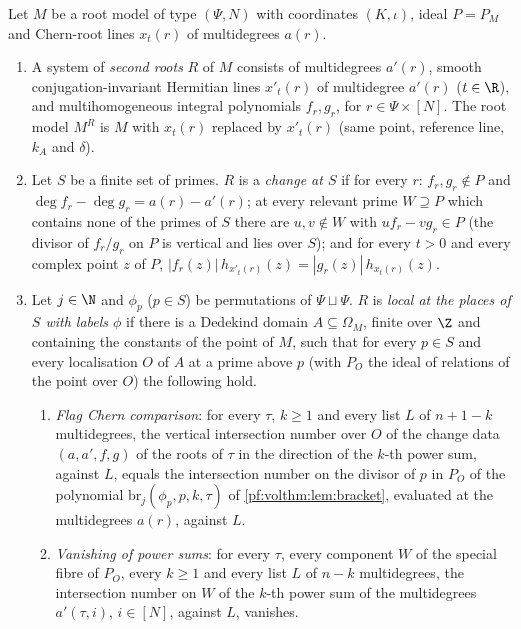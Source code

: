\begin{definition}\label{pf:volthm:def:secondroots}
Let $M$ be a root model of type $(\Psi,N)$ with coordinates $(K,\iota)$, ideal $P=P_M$ and Chern-root lines
$x_t(r)$ of multidegrees $a(r)$.
\begin{enumerate}[label=(\alph*)]
\item A system of \emph{second roots} $R$ of $M$ consists of multidegrees $a'(r)$, smooth conjugation-invariant
Hermitian lines $x'_t(r)$ of multidegree $a'(r)$ ($t\in\R$), and multihomogeneous integral polynomials $f_r,g_r$, for
$r\in\Psi\times[N]$. The root model $M^R$ is $M$ with $x_t(r)$ replaced by $x'_t(r)$ (same point, reference line,
$k_A$ and $\delta$).
\item Let $S$ be a finite set of primes. $R$ is a \emph{change at $S$} if for every $r$: $f_r,g_r\notin P$ and
$\deg f_r-\deg g_r=a(r)-a'(r)$; at every relevant prime $W\supseteq P$ which contains none of the primes of $S$ there are
$u,v\notin W$ with $uf_r-vg_r\in P$ (the divisor of $f_r/g_r$ on $P$ is vertical and lies over $S$); and for every
$t>0$ and every complex point $z$ of $P$, $|f_r(z)|\,h_{x'_t(r)}(z)=|g_r(z)|\,h_{x_t(r)}(z)$.
\item Let $j\in\N$ and $\phi_p$ ($p\in S$) be permutations of $\Psi\sqcup\Psi$. $R$ is \emph{local at the places of $S$
with labels $\phi$} if there is a Dedekind domain $A\subseteq\Omega_M$, finite over $\Z$ and containing the
constants of the point of $M$, such that for every $p\in S$ and every localisation $O$ of $A$ at a prime above $p$
(with $P_O$ the ideal of relations of the point over $O$) the following hold.
  \begin{enumerate}[label=(\roman*)]
  \item \emph{Flag Chern comparison}: for every $\tau$, $k\ge1$ and every list $L$ of $n+1-k$ multidegrees, the
  vertical intersection number over $O$ of the change data $(a,a',f,g)$ of the roots of $\tau$ in the direction of the
  $k$-th power sum, against $L$, equals the intersection number on the divisor of $p$ in $P_O$ of the polynomial
  $\mathrm{br}_j(\phi_p,p,k,\tau)$ of \cref{pf:volthm:lem:bracket}, evaluated at the multidegrees $a(r)$, against $L$.
  \item \emph{Vanishing of power sums}: for every $\tau$, every component $W$ of the special fibre of $P_O$, every
  $k\ge1$ and every list $L$ of $n-k$ multidegrees, the intersection number on $W$ of the $k$-th power sum of the
  multidegrees $a'(\tau,i)$, $i\in[N]$, against $L$, vanishes.
  \end{enumerate}

\end{enumerate}
\end{definition}
